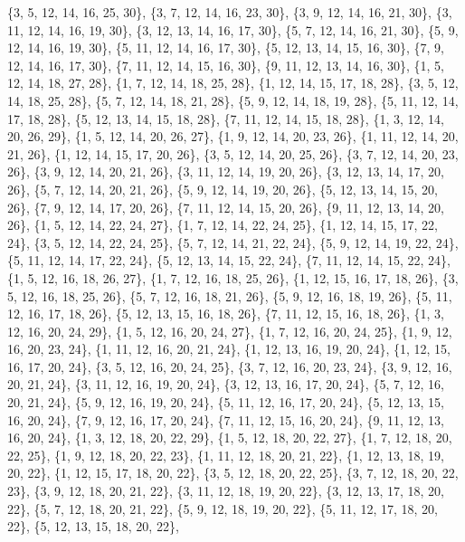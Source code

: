 \documentclass[11pt,a4paper]{article}
\begin{document}
{\{3, 5, 12, 14, 16, 25, 30\}, \{3, 7, 12, 14, 16, 23, 30\}, \{3, 9, 12, 14, 16, 21, 30\}, \{3, 11, 12, 14, 16, 19, 30\}, \{3, 12, 13, 14, 16, 17, 30\},
\{5, 7, 12, 14, 16, 21, 30\}, \{5, 9, 12, 14, 16, 19, 30\}, \{5, 11, 12, 14, 16, 17, 30\}, \{5, 12, 13, 14, 15, 16, 30\}, \{7, 9, 12, 14, 16, 17, 30\},
\{7, 11, 12, 14, 15, 16, 30\}, \{9, 11, 12, 13, 14, 16, 30\}, \{1, 5, 12, 14, 18, 27, 28\}, \{1, 7, 12, 14, 18, 25, 28\}, \{1, 12, 14, 15, 17, 18, 28\},
\{3, 5, 12, 14, 18, 25, 28\}, \{5, 7, 12, 14, 18, 21, 28\}, \{5, 9, 12, 14, 18, 19, 28\}, \{5, 11, 12, 14, 17, 18, 28\}, \{5, 12, 13, 14, 15, 18, 28\},
\{7, 11, 12, 14, 15, 18, 28\}, \{1, 3, 12, 14, 20, 26, 29\}, \{1, 5, 12, 14, 20, 26, 27\}, \{1, 9, 12, 14, 20, 23, 26\}, \{1, 11, 12, 14, 20, 21, 26\},
\{1, 12, 14, 15, 17, 20, 26\}, \{3, 5, 12, 14, 20, 25, 26\}, \{3, 7, 12, 14, 20, 23, 26\}, \{3, 9, 12, 14, 20, 21, 26\}, \{3, 11, 12, 14, 19, 20, 26\},
\{3, 12, 13, 14, 17, 20, 26\}, \{5, 7, 12, 14, 20, 21, 26\}, \{5, 9, 12, 14, 19, 20, 26\}, \{5, 12, 13, 14, 15, 20, 26\}, \{7, 9, 12, 14, 17, 20, 26\},
\{7, 11, 12, 14, 15, 20, 26\}, \{9, 11, 12, 13, 14, 20, 26\}, \{1, 5, 12, 14, 22, 24, 27\}, \{1, 7, 12, 14, 22, 24, 25\}, \{1, 12, 14, 15, 17, 22, 24\},
\{3, 5, 12, 14, 22, 24, 25\}, \{5, 7, 12, 14, 21, 22, 24\}, \{5, 9, 12, 14, 19, 22, 24\}, \{5, 11, 12, 14, 17, 22, 24\}, \{5, 12, 13, 14, 15, 22, 24\},
\{7, 11, 12, 14, 15, 22, 24\}, \{1, 5, 12, 16, 18, 26, 27\}, \{1, 7, 12, 16, 18, 25, 26\}, \{1, 12, 15, 16, 17, 18, 26\}, \{3, 5, 12, 16, 18, 25, 26\},
\{5, 7, 12, 16, 18, 21, 26\}, \{5, 9, 12, 16, 18, 19, 26\}, \{5, 11, 12, 16, 17, 18, 26\}, \{5, 12, 13, 15, 16, 18, 26\}, \{7, 11, 12, 15, 16, 18, 26\},
\{1, 3, 12, 16, 20, 24, 29\}, \{1, 5, 12, 16, 20, 24, 27\}, \{1, 7, 12, 16, 20, 24, 25\}, \{1, 9, 12, 16, 20, 23, 24\}, \{1, 11, 12, 16, 20, 21, 24\},
\{1, 12, 13, 16, 19, 20, 24\}, \{1, 12, 15, 16, 17, 20, 24\}, \{3, 5, 12, 16, 20, 24, 25\}, \{3, 7, 12, 16, 20, 23, 24\}, \{3, 9, 12, 16, 20, 21, 24\},
\{3, 11, 12, 16, 19, 20, 24\}, \{3, 12, 13, 16, 17, 20, 24\}, \{5, 7, 12, 16, 20, 21, 24\}, \{5, 9, 12, 16, 19, 20, 24\}, \{5, 11, 12, 16, 17, 20, 24\},
\{5, 12, 13, 15, 16, 20, 24\}, \{7, 9, 12, 16, 17, 20, 24\}, \{7, 11, 12, 15, 16, 20, 24\}, \{9, 11, 12, 13, 16, 20, 24\}, \{1, 3, 12, 18, 20, 22, 29\},
\{1, 5, 12, 18, 20, 22, 27\}, \{1, 7, 12, 18, 20, 22, 25\}, \{1, 9, 12, 18, 20, 22, 23\}, \{1, 11, 12, 18, 20, 21, 22\}, \{1, 12, 13, 18, 19, 20, 22\},
\{1, 12, 15, 17, 18, 20, 22\}, \{3, 5, 12, 18, 20, 22, 25\}, \{3, 7, 12, 18, 20, 22, 23\}, \{3, 9, 12, 18, 20, 21, 22\}, \{3, 11, 12, 18, 19, 20, 22\},
\{3, 12, 13, 17, 18, 20, 22\}, \{5, 7, 12, 18, 20, 21, 22\}, \{5, 9, 12, 18, 19, 20, 22\}, \{5, 11, 12, 17, 18, 20, 22\}, \{5, 12, 13, 15, 18, 20, 22\},
}
\end{document}
